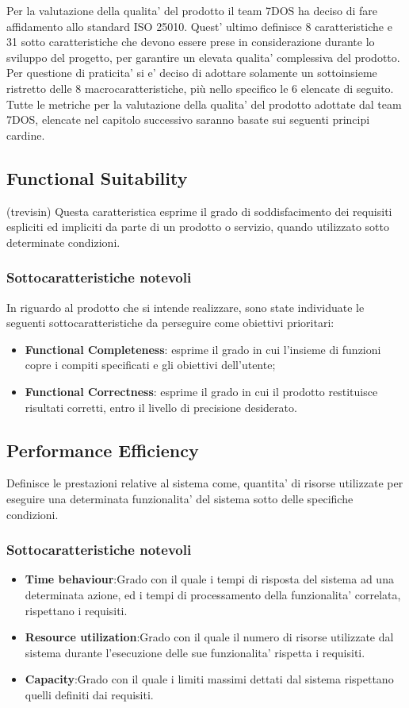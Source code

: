 Per la valutazione della qualita' del prodotto il team 7DOS ha deciso di fare affidamento allo standard ISO 25010.
Quest' ultimo definisce 8 caratteristiche e 31 sotto caratteristiche che devono essere prese in considerazione durante lo sviluppo del progetto, per garantire un  elevata qualita' complessiva del prodotto.
Per questione di praticita' si e' deciso di adottare solamente un sottoinsieme ristretto delle 8 macrocaratteristiche, più nello specifico le 6 elencate di seguito.
Tutte le metriche per la valutazione della qualita' del prodotto adottate dal team 7DOS, elencate nel capitolo successivo saranno basate sui seguenti principi cardine.
\subsection{Functional Suitability} (trevisin)
Questa caratteristica esprime il grado di soddisfacimento dei requisiti espliciti ed impliciti da parte di un prodotto o servizio, quando utilizzato sotto determinate condizioni.
\subsubsection{Sottocaratteristiche notevoli}
In riguardo al prodotto che si intende realizzare, sono state individuate le seguenti sottocaratteristiche da perseguire come obiettivi prioritari: 
\begin{itemize}
	\item{\textbf{Functional Completeness}}: esprime il grado in cui l'insieme di funzioni copre i compiti specificati e gli obiettivi dell'utente;
	\item{\textbf{Functional Correctness}}: esprime il grado in cui il prodotto restituisce risultati corretti, entro il livello di precisione desiderato.
\end{itemize}

\subsection{Performance Efficiency}
Definisce le prestazioni relative al sistema come, quantita' di risorse utilizzate per eseguire una determinata funzionalita' del sistema sotto delle specifiche condizioni. 
\subsubsection{Sottocaratteristiche notevoli}
\begin{itemize}
	\item{\textbf{Time behaviour}}:Grado con il quale i tempi di risposta del sistema ad una determinata azione, ed i tempi di processamento della funzionalita' correlata, rispettano i requisiti.
	\item{\textbf{Resource utilization}}:Grado con il quale il numero di risorse utilizzate dal sistema durante l'esecuzione delle sue funzionalita' rispetta i requisiti.
	\item{\textbf{Capacity}}:Grado con il quale i limiti massimi dettati dal sistema rispettano quelli definiti dai requisiti.
\end{itemize}
